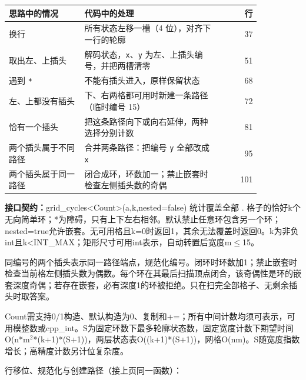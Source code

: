 \begin{center}\small
\begin{tabular}{@{}p{0.30\linewidth}p{0.55\linewidth}r@{}}
\toprule
思路中的情况 & 代码中的处理 & 行\\
\midrule
换行 & 所有状态左移一槽（4 位），对齐下一行的轮廓 & 37\\
取出左、上插头 & 解码状态，\texttt{x}、\texttt{y} 为左、上插头编号，并把两槽清零 & 51\\
遇到 \texttt{*} & 不能有插头进入，原样保留状态 & 68\\
左、上都没有插头 & 下、右两格都可用时新建一条路径（临时编号 15） & 72\\
恰有一个插头 & 把这条路径向下或向右延伸，两种选择分别计数 & 81\\
两个插头属于不同路径 & 合并两条路径：把编号 \texttt{y} 全部改成 \texttt{x} & 95\\
两个插头属于同一路径 & 闭合成环，环数加一；禁止嵌套时检查左侧插头数的奇偶 & 101\\
\bottomrule
\end{tabular}
\end{center}



{\sloppy{}\noindent\textbf{接口契约：}grid\_cycles<Count>(a,k,nested=false) 统计覆盖全部 . 格子的恰好k个无向简单环；*为障碍，只有上下左右相邻。默认禁止任意环包含另一个环；nested=true允许嵌套。无可用格且k=0时返回1，其余无法覆盖时返回0。k为非负int且k<INT\_MAX；矩形尺寸可用int表示，自动转置后宽度m$\le$15。

同编号的两个插头表示同一路径端点，规范化编号。闭环时环数加1；禁止嵌套时检查当前格左侧插头数为偶数。每个环在其最后扫描顶点闭合，该奇偶性是环的嵌套深度奇偶；若存在嵌套，必有深度1的环被拒绝。只在扫完全部格子、无剩余插头时取答案。

Count需支持0/1构造、默认构造为0、复制和+=；所有中间计数均须可表示，可用模整数或cpp\_int。S为固定环数下最多轮廓状态数，固定宽度计数下期望时间O(n*m$^{2}$*(k+1)*(S+1))，两层状态表O((k+1)*(S+1))，网格O(nm)。S随宽度指数增长；高精度计数另计位复杂度。\par}

\Needspace{440pt}



\newpage

行移位、规范化与创建路径（接上页同一函数）：



